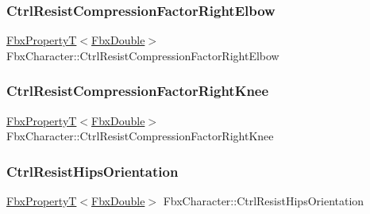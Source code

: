 \subsubsection{\texorpdfstring{Ctrl\+Resist\+Compression\+Factor\+Right\+Elbow}{CtrlResistCompressionFactorRightElbow}}
{\footnotesize\ttfamily \hyperlink{class_fbx_property_t}{Fbx\+PropertyT}$<$\hyperlink{fbxtypes_8h_a171e72a1c46fc15c1a6c9c31948c1c5b}{Fbx\+Double}$>$ Fbx\+Character\+::\+Ctrl\+Resist\+Compression\+Factor\+Right\+Elbow}

\mbox{\label{class_fbx_character_af614d06aabafac970336bf6bcdeace0b}} 
\subsubsection{\texorpdfstring{Ctrl\+Resist\+Compression\+Factor\+Right\+Knee}{CtrlResistCompressionFactorRightKnee}}
{\footnotesize\ttfamily \hyperlink{class_fbx_property_t}{Fbx\+PropertyT}$<$\hyperlink{fbxtypes_8h_a171e72a1c46fc15c1a6c9c31948c1c5b}{Fbx\+Double}$>$ Fbx\+Character\+::\+Ctrl\+Resist\+Compression\+Factor\+Right\+Knee}

\mbox{\label{class_fbx_character_ae947bede68ae4923aef77c4abe90d30e}} 
\subsubsection{\texorpdfstring{Ctrl\+Resist\+Hips\+Orientation}{CtrlResistHipsOrientation}}
{\footnotesize\ttfamily \hyperlink{class_fbx_property_t}{Fbx\+PropertyT}$<$\hyperlink{fbxtypes_8h_a171e72a1c46fc15c1a6c9c31948c1c5b}{Fbx\+Double}$>$ Fbx\+Character\+::\+Ctrl\+Resist\+Hips\+Orientation}

\mbox{\label{class_fbx_character_a9df873c898296109d772b66c495158f2}} 

